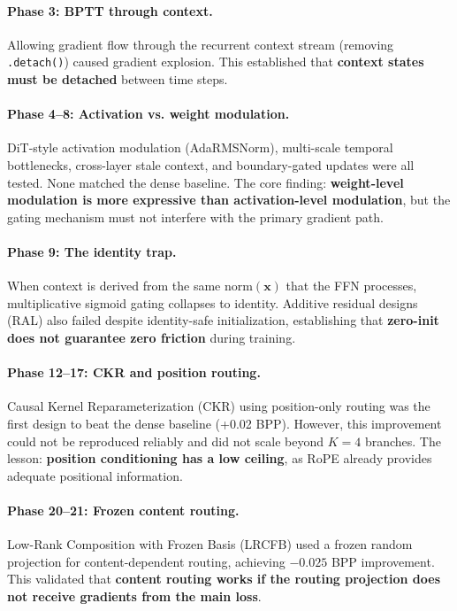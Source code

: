 \documentclass{article}
\begin{document}
\paragraph{Phase 3: BPTT through context.}
Allowing gradient flow through the recurrent context stream (removing \texttt{.detach()}) caused gradient explosion. This established that \textbf{context states must be detached} between time steps.

\paragraph{Phase 4--8: Activation vs. weight modulation.}
DiT-style activation modulation (AdaRMSNorm), multi-scale temporal bottlenecks, cross-layer stale context, and boundary-gated updates were all tested. None matched the dense baseline. The core finding: \textbf{weight-level modulation is more expressive than activation-level modulation}, but the gating mechanism must not interfere with the primary gradient path.

\paragraph{Phase 9: The identity trap.}
When context is derived from the same $\text{norm}(\mathbf{x})$ that the FFN processes, multiplicative sigmoid gating collapses to identity. Additive residual designs (RAL) also failed despite identity-safe initialization, establishing that \textbf{zero-init does not guarantee zero friction} during training.

\paragraph{Phase 12--17: CKR and position routing.}
Causal Kernel Reparameterization (CKR) using position-only routing was the first design to beat the dense baseline (+0.02 BPP). However, this improvement could not be reproduced reliably and did not scale beyond $K{=}4$ branches. The lesson: \textbf{position conditioning has a low ceiling}, as RoPE already provides adequate positional information.

\paragraph{Phase 20--21: Frozen content routing.}
Low-Rank Composition with Frozen Basis (LRCFB) used a frozen random projection for content-dependent routing, achieving $-0.025$ BPP improvement. This validated that \textbf{content routing works if the routing projection does not receive gradients from the main loss}.
\end{document}
